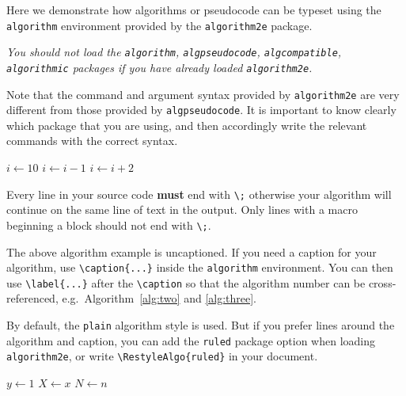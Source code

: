 \documentclass[11pt]{article}
\begin{document}
Here we demonstrate how algorithms or pseudocode can be typeset using the \verb|algorithm| environment provided by the \verb|algorithm2e| package.

{\itshape You should not load the \verb|algorithm|, \verb|algpseudocode|, \verb|algcompatible|, \verb|algorithmic| packages if you have already loaded \verb|algorithm2e|.} 

Note that the command and argument syntax provided by \verb|algorithm2e| are very different from those provided by \verb|algpseudocode|. It is important to know clearly which package that you are using, and then accordingly write the relevant commands with the correct syntax.

\begin{algorithm}
$i\gets 10$\;
{
    $i\gets i-1$\;
}{
    {
        $i\gets i+2$\;
    }
}
\end{algorithm}

Every line in your source code \textbf{must} end with \verb|\;| otherwise your algorithm will continue on the same line of text in the output. Only lines with a macro beginning a block should not end with \verb|\;|.

The above algorithm example is uncaptioned. If you need a caption for your algorithm, use \verb|\caption{...}| inside the \verb|algorithm| environment.
You can then use \verb|\label{...}| after the \verb|\caption| so that the algorithm number can be cross-referenced, e.g.~Algorithm~\ref{alg:two} and \ref{alg:three}.

By default, the \verb|plain| algorithm style is used. But if you prefer lines around the algorithm and caption, you can add the \verb|ruled| package option when loading \verb|algorithm2e|, or write \verb|\RestyleAlgo{ruled}| in your document.


{}

\begin{algorithm}[hbt!]
\caption{An algorithm with caption}\label{alg:two}
$y \gets 1$\;
$X \gets x$\;
$N \gets n$\;
\end{algorithm}
\end{document}
